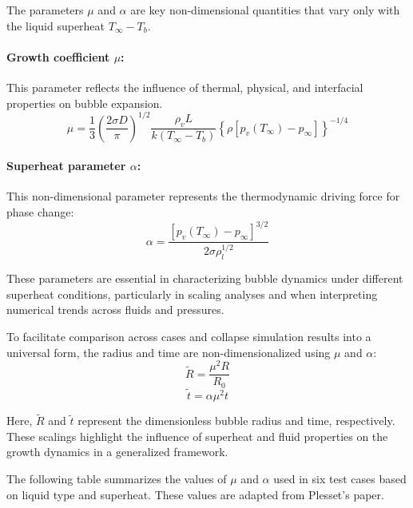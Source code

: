 \documentclass[aps,pre,twocolumn,superscriptaddress,floatfix]{revtex4-2}
\begin{document}
The parameters $\mu$ and $\alpha$ are key non-dimensional quantities that vary only with the liquid superheat $T_{\infty} - T_b$.

\paragraph{Growth coefficient $\mu$:} This parameter reflects the influence of thermal, physical, and interfacial properties on bubble expansion.
\begin{equation}
\mu = \frac{1}{3} \left( \frac{2 \sigma D}{\pi} \right)^{1/2} \frac{\rho_v L}{k (T_{\infty} - T_b)} \left\{ \rho [p_v(T_{\infty}) - p_{\infty}] \right\}^{-1/4} \tag{18}
\end{equation}

\paragraph{Superheat parameter $\alpha$:} This non-dimensional parameter represents the thermodynamic driving force for phase change:
\begin{equation}
\alpha = \frac{\left[ p_v(T_{\infty}) - p_{\infty} \right]^{3/2}}{2 \sigma \rho_l^{1/2}} \tag{19}
\end{equation}

These parameters are essential in characterizing bubble dynamics under different superheat conditions, particularly in scaling analyses and when interpreting numerical trends across fluids and pressures.

To facilitate comparison across cases and collapse simulation results into a universal form, the radius and time are non-dimensionalized using $\mu$ and $\alpha$:
\begin{equation}
\tilde{R} = \frac{\mu^2 R}{R_0} \tag{20}
\end{equation}
\begin{equation}
\tilde{t} = \alpha \mu^2 t \tag{21}
\end{equation}

Here, $\tilde{R}$ and $\tilde{t}$ represent the dimensionless bubble radius and time, respectively. These scalings highlight the influence of superheat and fluid properties on the growth dynamics in a generalized framework.

The following table summarizes the values of $\mu$ and $\alpha$ used in six test cases based on liquid type and superheat. These values are adapted from Plesset's paper.
\end{document}
